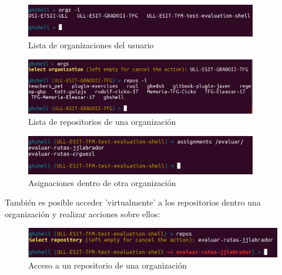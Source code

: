         \begin{figure}[H]
		\begin{center}
		\includegraphics[width=0.9\textwidth]{images/ghshell3}
		\caption{Lista de organizaciones del usuario}
		\label{fig:ghshell3}
		\end{center}
		\end{figure}
		
		\begin{figure}[H]
		\begin{center}
		\includegraphics[width=0.9\textwidth]{images/ghshell4}
		\caption{Lista de repositorios de una organización}
		\label{fig:ghshell4}
		\end{center}
		\end{figure}
		
		\begin{figure}[H]
		\begin{center}
		\includegraphics[width=0.9\textwidth]{images/ghshell5}
		\caption{Asignaciones dentro de otra organización}
		\label{fig:ghshell5}
		\end{center}
		\end{figure}

\newpage

	También es posible acceder 'virtualmente' a los repositorios dentro una organización y realizar acciones sobre ellos:
	
		\begin{figure}[H]
		\begin{center}
		\includegraphics[width=1\textwidth]{images/ghshell5-1}
		\caption{Acceso a un repositorio de una organización}
		\label{fig:ghshell5-1}
		\end{center}
		\end{figure}

